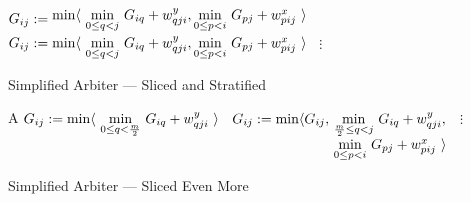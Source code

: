 \begin{algorithm}
\renewcommand\arraystretch{1.3}
\begin{algorithmic}
\EndProcedure
      
      \State \hspace{-.5cm}$G_{ij} :=
        \begin{array}{@{}l@{~}l} 
          \min\langle & \underset{0\leq q<j}\min ~ G_{iq} + \yw{qji}, 
                        \underset{0\leq p<i}\min ~ G_{pj} + \xw{pij}~\rangle \\         
        \end{array}$
    \EndFor
  \EndFor
      
      \State \hspace{-.5cm}$G_{ij} :=
        \begin{array}[t]{@{}l@{~}l} 
          \min\langle & \underset{0\leq q<j}\min ~ G_{iq} + \yw{qji}, 
                        \underset{0\leq p<i}\min ~ G_{pj} + \xw{pij}~\rangle \\         
        \end{array}$
    \EndFor
  \EndFor
  \State $\vdots$ 
\end{algorithmic}
\caption{\label{overview:breakdown}
   Simplified Arbiter --- Sliced and Stratified}
\end{algorithm}

\begin{algorithm}
\renewcommand\arraystretch{1.3}
\begin{algorithmic}
\EndProcedure
  \State A 
      
      \State $G_{ij} :=
        \begin{array}[t]{@{}l@{~}l} 
          \min\langle & \underset{0\leq q<\frac{m}{2}}\min ~ G_{iq} + \yw{qji}~\rangle \\         
        \end{array}$
    \EndFor
  \EndFor
      \State $G_{ij} :=
        \begin{array}[t]{@{}l@{~}l} 
          \min\langle G_{ij}, & \underset{\frac{m}{2}\leq q<j}\min ~ G_{iq} + \yw{qji}, \\
                      & \underset{0\leq p<i}\min ~ G_{pj} + \xw{pij}~\rangle \\         
        \end{array}$
    \EndFor
  \EndFor
  \State $\vdots$
\end{algorithmic}
\caption{\label{overview:further-breakdown}
   Simplified Arbiter --- Sliced Even More}
\end{algorithm}


